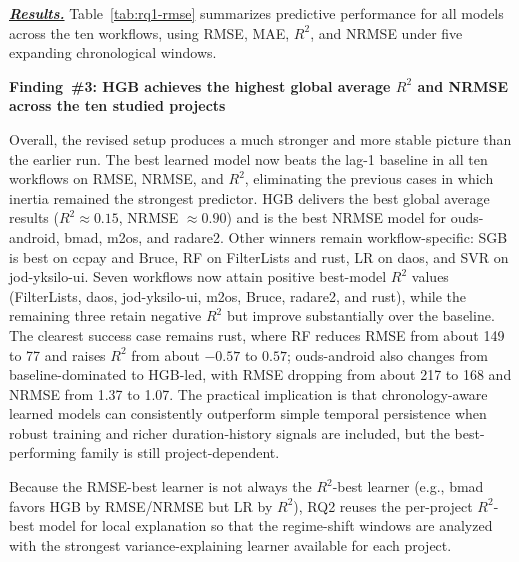 \documentclass[conference]{IEEEconf}
\newcommand{\ali}[1]{\textcolor{red}{{\it [Ali: #1]}}}
\newcommand{\jasem}[1]{\textcolor{blue}{{\it [Jasem: #1]}}}
\begin{document}
\noindent\underline{\textbf{\textit{Results.}}} Table~\ref{tab:rq1-rmse} summarizes predictive performance for all models across the ten workflows, using RMSE, MAE, $R^2$, and NRMSE under five expanding chronological windows.

\noindent\textbf{Finding~\#3: HGB achieves the highest global average $R^2$ and NRMSE across the ten studied projects}

Overall, the revised setup produces a much stronger and more stable picture than the earlier run. The best learned model now beats the lag-1 baseline in all ten workflows on RMSE, NRMSE, and $R^2$, eliminating the previous cases in which inertia remained the strongest predictor. HGB delivers the best global average results ($R^2 \approx 0.15$, NRMSE $\approx 0.90$) and is the best NRMSE model for ouds-android, bmad, m2os, and radare2. Other winners remain workflow-specific: SGB is best on ccpay and Bruce, RF on FilterLists and rust, LR on daos, and SVR on jod-yksilo-ui. Seven workflows now attain positive best-model $R^2$ values (FilterLists, daos, jod-yksilo-ui, m2os, Bruce, radare2, and rust), while the remaining three retain negative $R^2$ but improve substantially over the baseline. The clearest success case remains rust, where RF reduces RMSE from about 149 to 77 and raises $R^2$ from about $-0.57$ to $0.57$; ouds-android also changes from baseline-dominated to HGB-led, with RMSE dropping from about 217 to 168 and NRMSE from 1.37 to 1.07. The practical implication is that chronology-aware learned models can consistently outperform simple temporal persistence when robust training and richer duration-history signals are included, but the best-performing family is still project-dependent.

Because the RMSE-best learner is not always the $R^2$-best learner (e.g., bmad favors HGB by RMSE/NRMSE but LR by $R^2$), RQ2 reuses the per-project $R^2$-best model for local explanation so that the regime-shift windows are analyzed with the strongest variance-explaining learner available for each project.
\end{document}
